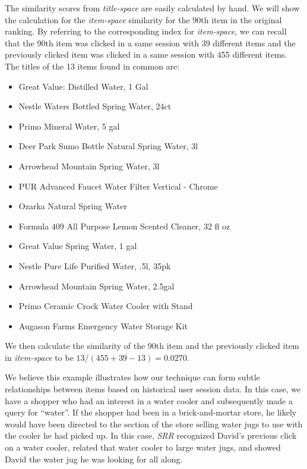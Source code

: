 \documentclass{article}
\begin{document}
The similarity scores from {\em title-space} are easily calculated by hand. We
will show the calculation for the {\em item-space} similarity for the 90th item
in the original ranking. By referring to the corresponding index for {\em
item-space}, we can recall that the 90th item was clicked in a same session with
39 different items and the previously clicked item was clicked in a same session
with 455 different items. The titles of the 13 items found in common are:
\begin{itemize}
    \item[] Great Value: Distilled Water, 1 Gal
    \item[] Nestle Waters Bottled Spring Water, 24ct
    \item[] Primo Mineral Water, 5 gal
    \item[] Deer Park Sumo Bottle Natural Spring Water, 3l
    \item[] Arrowhead Mountain Spring Water, 3l
    \item[] PUR Advanced Faucet Water Filter Vertical - Chrome
    \item[] Ozarka Natural Spring Water
    \item[] Formula 409 All Purpose Lemon Scented Cleaner, 32 fl oz
    \item[] Great Value Spring Water, 1 gal
    \item[] Nestle Pure Life Purified Water, .5l, 35pk
    \item[] Arrowhead Mountain Spring Water, 2.5gal
    \item[] Primo Ceramic Crock Water Cooler with Stand
    \item[] Augason Farms Emergency Water Storage Kit
\end{itemize}
We then calculate the similarity of the 90th item and the previously clicked
item in {\em item-space} to be $13/(455+39-13)=0.0270$.

We believe this example illustrates how our technique can form subtle
relationships between items based on historical user session data. In this case,
we have a shopper who had an interest in a water cooler and subsequently made a
query for ``water''. If the shopper had been in a brick-and-mortar store, he
likely would have been directed to the section of the store selling water jugs
to use with the cooler he had picked up. In this case, {\em SRR} recognized
David's previous click on a water cooler, related that water cooler to large
water jugs, and showed David the water jug he was looking for all along.
\end{document}
